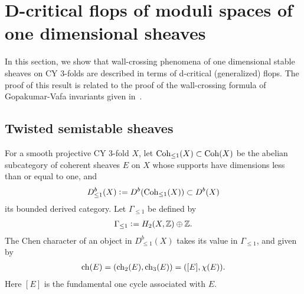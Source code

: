 \documentclass[11pt]{amsart}
\theoremstyle{plain}
\theoremstyle{definition}
\theoremstyle{remark}
\newcommand{\ch}{\mathop{\rm ch}\nolimits}
\newcommand{\Coh}{\mathop{\rm Coh}\nolimits}
\begin{document}
\section{D-critical flops of moduli spaces of one dimensional sheaves}
\label{sec:onedim}
In this section, we show that 
wall-crossing phenomena of 
one dimensional stable sheaves on CY 3-folds are described in terms of 
d-critical (generalized) flops. 
The proof of this result is related to the proof of the 
wall-crossing formula of Gopakumar-Vafa invariants given in~\cite{TodGV}. 







\subsection{Twisted semistable sheaves}\label{subsec:twist2}
For a smooth projective CY 3-fold $X$, let 
$\Coh_{\le 1}(X) \subset \Coh(X)$
be
the abelian subcategory of 
coherent sheaves $E$ on $X$ whose supports have dimensions less than or equal to one, 
and 
\begin{align*}
D^b_{\le 1}(X) \cneq D^b(\Coh_{\le 1}(X))\subset D^b(X)
\end{align*}
its bounded derived category. 
Let $\Gamma_{\le 1}$ be defined by
\begin{align}\label{def:Gamma}
\Gamma_{\le 1} \cneq H_2(X, \mathbb{Z}) \oplus \mathbb{Z}.
\end{align}
The Chen character 
of an object in $D^b_{\le 1}(X)$ takes
its value in $\Gamma_{\le 1}$, and given by
\begin{align}\label{ch:Gamma}
\ch(E)=(\ch_2(E), \ch_3(E)) =([E], \chi(E)). 
\end{align}
Here $[E]$ is the fundamental one cycle associated with $E$. 
\end{document}
